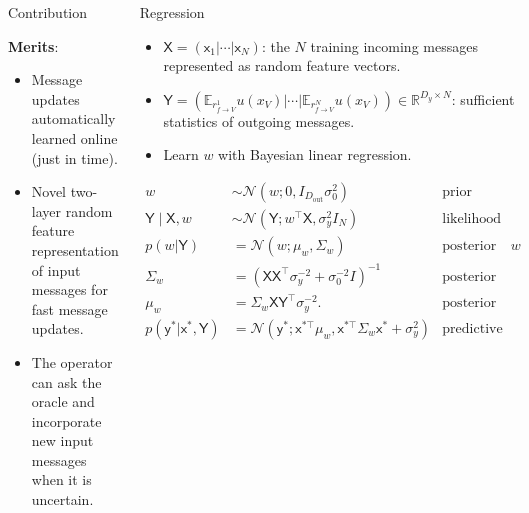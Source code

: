 \documentclass[english]{beamer}
\newcommand{\factor}{f}				%
\newcommand{\outV}{V}                         %
\begin{document}
\begin{frame}
\begin{columns}[t]
\begin{block}{Contribution }

\vspace*{3mm}
\textbf{Merits}:
\begin{itemize}

\item  Message updates automatically learned online (just in time).

\item Novel two-layer random feature representation of input
messages for fast message updates.

\item The operator can ask the oracle and incorporate new input
messages when it is uncertain.
\end{itemize}

\end{block}



\begin{block}{Regression}
\begin{itemize}
    \item $\mathsf{X}=\left(\mathsf{x}_{1}|\cdots|\mathsf{x}_{N}\right)$: 
        the $N$ training incoming messages represented as random feature vectors.
    \item $\mathsf{Y}=\left(\mathbb{E}_{r_{\factor\rightarrow
        \outV}^{1}}u(x_{\outV})|\cdots|\mathbb{E}_{r_{f\rightarrow
        \outV}^{N}}u(x_{\outV})\right)\in\mathbb{R}^{D_{y}\times N}$: 
        sufficient statistics of outgoing messages.
    \item Learn $w$ with Bayesian linear regression.
\end{itemize}

%
\small
\begin{align*}
    w & \sim\mathcal{N}\left(w;0,I_{D_\mathrm{out}}\sigma_{0}^{2}\right) & \text{prior}  \\
    \mathsf{Y} \mid \mathsf{X},w & \sim\mathcal{N}\left(\mathsf{Y};w^{\top}
    \mathsf{X},\sigma_{y}^{2}I_{N}\right) & \text{likelihood}\\
%
    p(w | \mathsf{Y}) & =\mathcal{N}(w;\mu_{w},\Sigma_{w}) & \text{posterior of } w \\
    \Sigma_{w} & = \left( \mathsf{X}
    \mathsf{X}^{\top}\sigma_{y}^{-2}+\sigma_{0}^{-2}I \right)^{-1} 
    & \text{posterior covariance}\\
    \mu_{w} & =\Sigma_{w} \mathsf{X} \mathsf{Y}^{\top}\sigma_{y}^{-2}. 
    & \text{posterior mean }\\
    p(\mathsf{y}^{*}| \mathsf{x}^{*}, \mathsf{Y}) 
    & =\mathcal{N}\left(\mathsf{y}^{*}; \mathsf{x}^{*\top}\mu_{w},
    \mathsf{x}^{*\top}\Sigma_{w} \mathsf{x}^{*}+\sigma_{y}^{2}\right)
    & \text{predictive dist.}
\end{align*}


\end{block}
\end{columns}
\end{frame}
\end{document}
